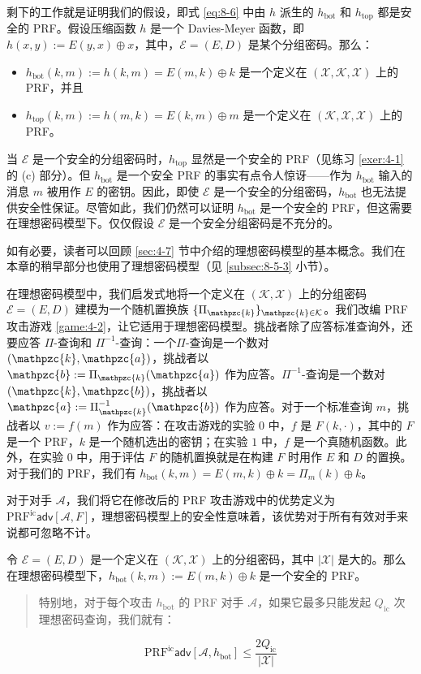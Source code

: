 剩下的工作就是证明我们的假设，即式 \ref{eq:8-6} 中由 $h$ 派生的 $h_\mathrm{bot}$ 和 $h_\mathrm{top}$ 都是安全的 PRF。假设压缩函数 $h$ 是一个 Davies-Meyer 函数，即 $h(x,y):=E(y,x)\oplus x$，其中，$\mathcal{E}=(E,D)$ 是某个分组密码。那么：
\begin{itemize}
	\item $h_\mathrm{bot}(k,m):=h(k,m)=E(m,k)\oplus k$ 是一个定义在 $(\mathcal{X},\mathcal{K},\mathcal{X})$ 上的 PRF，并且
	\item $h_\mathrm{top}(k,m):=h(m,k)=E(k,m)\oplus m$ 是一个定义在 $(\mathcal{K},\mathcal{X},\mathcal{X})$ 上的 PRF。
\end{itemize}
当 $\mathcal{E}$ 是一个安全的分组密码时，$h_\mathrm{top}$ 显然是一个安全的 PRF（见练习 \ref{exer:4-1} 的 (c) 部分）。但 $h_\mathrm{bot}$ 是一个安全 PRF 的事实有点令人惊讶——作为 $h_\mathrm{bot}$ 输入的消息 $m$ 被用作 $E$ 的密钥。因此，即使 $\mathcal{E}$ 是一个安全的分组密码，$h_\mathrm{bot}$ 也无法提供安全性保证。尽管如此，我们仍然可以证明 $h_\mathrm{bot}$ 是一个安全的 PRF，但这需要在理想密码模型下。仅仅假设 $\mathcal{E}$ 是一个安全分组密码是不充分的。

如有必要，读者可以回顾 \ref{sec:4-7} 节中介绍的理想密码模型的基本概念。我们在本章的稍早部分也使用了理想密码模型（见 \ref{subsec:8-5-3} 小节）。

在理想密码模型中，我们启发式地将一个定义在 $(\mathcal{K},\mathcal{X})$ 上的分组密码 $\mathcal{E}=(E,D)$ 建模为一个随机置换族 $\{\Pi_\mathpzc{k}\}_{\mathpzc{k}\in\mathcal{K}}$。我们改编 PRF 攻击游戏 \ref{game:4-2}，让它适用于理想密码模型。挑战者除了应答标准查询外，还要应答 $\Pi$-查询和 $\Pi^{-1}$-查询：一个$\Pi$-查询是一个数对 $(\mathpzc{k},\mathpzc{a})$，挑战者以 $\mathpzc{b}:=\Pi_\mathpzc{k}(\mathpzc{a})$ 作为应答。$\Pi^{-1}$-查询是一个数对 $(\mathpzc{k},\mathpzc{b})$，挑战者以 $\mathpzc{a}:=\Pi_\mathpzc{k}^{-1}(\mathpzc{b})$ 作为应答。对于一个标准查询 $m$，挑战者以 $v:=f(m)$ 作为应答：在攻击游戏的实验 $0$ 中，$f$ 是 $F(k,\cdot)$，其中的 $F$ 是一个 PRF，$k$ 是一个随机选出的密钥；在实验 $1$ 中，$f$ 是一个真随机函数。此外，在实验 $0$ 中，用于评估 $F$ 的随机置换就是在构建 $F$ 时用作 $E$ 和 $D$ 的置换。对于我们的 PRF，我们有 $h_\mathrm{bot}(k,m)=E(m,k)\oplus k=\Pi_m(k)\oplus k$。

对于对手 $\mathcal{A}$，我们将它在修改后的 PRF 攻击游戏中的优势定义为 $\mathrm{PRF}^\mathrm{ic}\mathsf{adv}[\mathcal{A},F]$，理想密码模型上的安全性意味着，该优势对于所有有效对手来说都可忽略不计。

\begin{theorem}\label{theo:8-5}
令 $\mathcal{E}=(E,D)$ 是一个定义在 $(\mathcal{K},\mathcal{X})$ 上的分组密码，其中 $|\mathcal{X}|$ 是大的。那么在理想密码模型下，$h_\mathrm{bot}(k,m):=E(m,k)\oplus k$ 是一个安全的 PRF。
\begin{quote}
特别地，对于每个攻击 $h_\mathrm{bot}$ 的 PRF 对手 $\mathcal{A}$，如果它最多只能发起 $Q_\mathrm{ic}$ 次理想密码查询，我们就有：
\end{quote}
\[
\mathrm{PRF}^\mathrm{ic}\mathsf{adv}[\mathcal{A},h_\mathrm{bot}]\leq\frac{2Q_\mathrm{ic}}{|\mathcal{X}|}
\]
\end{theorem}

